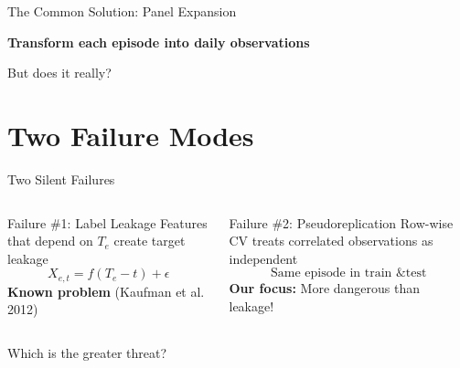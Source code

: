 \documentclass[aspectratio=169]{beamer}
\begin{document}
\begin{frame}{The Common Solution: Panel Expansion}
\begin{center}
\textbf{Transform each episode into daily observations}

\vspace{1em}
\end{center}

\vspace{1em}
\begin{center}
\Large But does it really?
\end{center}
\end{frame}

\section{Two Failure Modes}

\begin{frame}{Two Silent Failures}
\begin{columns}[T]
\begin{block}{Failure \#1: Label Leakage}
Features that depend on $T_e$ create target leakage
\[X_{e,t} = f(T_e - t) + \epsilon\]
\textbf{Known problem} (Kaufman et al. 2012)
\end{block}

\begin{block}{Failure \#2: Pseudoreplication}
Row-wise CV treats correlated observations as independent
\[\text{Same episode in train \& test}\]
\textbf{Our focus:} More dangerous than leakage!
\end{block}
\end{columns}

\vspace{2em}
\begin{center}
\Large\alert{Which is the greater threat?}
\end{center}
\end{frame}
\end{document}
